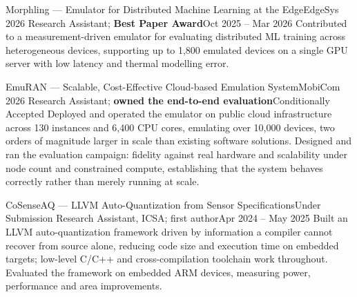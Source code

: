     \resumeSubheading
      {Morphling --- Emulator for Distributed Machine Learning at the Edge}{EdgeSys 2026}
      {Research Assistant; \textbf{Best Paper Award}}{Oct 2025 -- Mar 2026}
      \resumeItemListStart
          {Contributed to a measurement-driven emulator for evaluating distributed ML training across heterogeneous devices, supporting up to 1,800 emulated devices on a single GPU server with low latency and thermal modelling error.}
      \resumeItemListEnd

    \resumeSubheading
      {EmuRAN --- Scalable, Cost-Effective Cloud-based Emulation System}{MobiCom 2026}
      {Research Assistant; \textbf{owned the end-to-end evaluation}}{Conditionally Accepted}
      \resumeItemListStart
          {Deployed and operated the emulator on public cloud infrastructure across 130 instances and 6,400 CPU cores, emulating over 10,000 devices, two orders of magnitude larger in scale than existing software solutions.}
          {Designed and ran the evaluation campaign: fidelity against real hardware and scalability under node count and constrained compute, establishing that the system behaves correctly rather than merely running at scale.}
      \resumeItemListEnd

    \resumeSubheading
      {CoSenseAQ --- LLVM Auto-Quantization from Sensor Specifications}{Under Submission}
      {Research Assistant, ICSA; first author}{Apr 2024 -- May 2025}
      \resumeItemListStart
          {Built an LLVM auto-quantization framework driven by information a compiler cannot recover from source alone, reducing code size and execution time on embedded targets; low-level C/C++ and cross-compilation toolchain work throughout.}
          {Evaluated the framework on embedded ARM devices, measuring power, performance and area improvements.}
      \resumeItemListEnd

  \resumeSubHeadingListEnd
